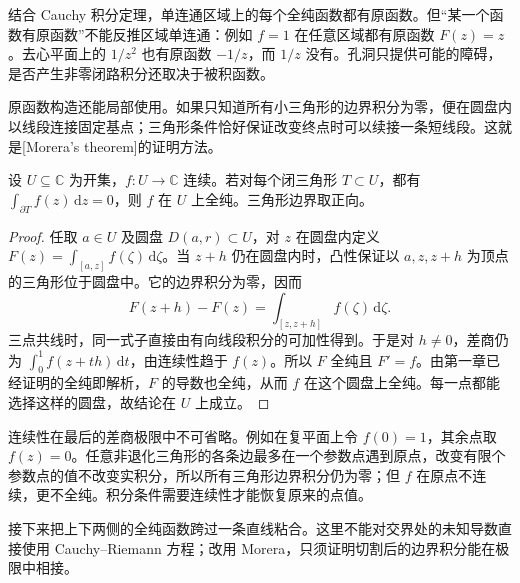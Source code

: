 结合 Cauchy 积分定理，单连通区域上的每个全纯函数都有原函数。但“某一个函数有原函数”不能反推区域单连通：例如 \(f=1\) 在任意区域都有原函数 \(F(z)=z\)。去心平面上的 \(1/z^2\) 也有原函数 \(-1/z\)，而 \(1/z\) 没有。孔洞只提供可能的障碍，是否产生非零闭路积分还取决于被积函数。

\ProseParagraphBreak

原函数构造还能局部使用。如果只知道所有小三角形的边界积分为零，便在圆盘内以线段连接固定基点；三角形条件恰好保证改变终点时可以续接一条短线段。这就是[Morera's theorem]的证明方法。

\begin{theorem}[Morera]\label{b3:thm:02-morera}
设 \(U\subseteq\mathbb C\) 为开集，\(f:U\to\mathbb C\) 连续。若对每个闭三角形 \(T\subset U\)，都有
\(\int_{\partial T}f(z)\,\mathrm{d}z=0\)，则 \(f\) 在 \(U\) 上全纯。三角形边界取正向。
\end{theorem}
\begin{proof}
任取 \(a\in U\) 及圆盘 \(D(a,r)\subset U\)，对 \(z\) 在圆盘内定义
\(F(z)=\int_{[a,z]}f(\zeta)\,\mathrm{d}\zeta\)。当 \(z+h\) 仍在圆盘内时，凸性保证以 \(a,z,z+h\) 为顶点的三角形位于圆盘中。它的边界积分为零，因而
\[
 F(z+h)-F(z)=\int_{[z,z+h]}f(\zeta)\,\mathrm{d}\zeta.
\]
三点共线时，同一式子直接由有向线段积分的可加性得到。于是对 \(h\ne0\)，差商仍为 \(\int_0^1f(z+th)\,\mathrm{d}t\)，由连续性趋于 \(f(z)\)。所以 \(F\) 全纯且 \(F'=f\)。由第一章已经证明的全纯即解析，\(F\) 的导数也全纯，从而 \(f\) 在这个圆盘上全纯。每一点都能选择这样的圆盘，故结论在 \(U\) 上成立。
\end{proof}

连续性在最后的差商极限中不可省略。例如在复平面上令 \(f(0)=1\)，其余点取 \(f(z)=0\)。任意非退化三角形的各条边最多在一个参数点遇到原点，改变有限个参数点的值不改变实积分，所以所有三角形边界积分仍为零；但 \(f\) 在原点不连续，更不全纯。积分条件需要连续性才能恢复原来的点值。

\ProseParagraphBreak

接下来把上下两侧的全纯函数跨过一条直线粘合。这里不能对交界处的未知导数直接使用 Cauchy--Riemann 方程；改用 Morera，只须证明切割后的边界积分能在极限中相接。


